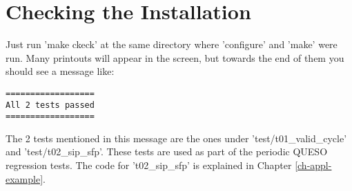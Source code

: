 \section{Checking the Installation} \label{sc-checks}

Just run 'make ckeck' at the same directory where 'configure' and 'make' were run.
Many printouts will appear in the screen, but towards the end of them you should see
a message like:
\begin{verbatim}
==================
All 2 tests passed
==================
\end{verbatim}

The 2 tests mentioned in this message are the ones under 'test/t01\_valid\_cycle' and
'test/t02\_sip\_sfp'. These tests are used as part of the periodic QUESO regression tests.
The code for 't02\_sip\_sfp' is explained in Chapter \ref{ch-appl-example}.
